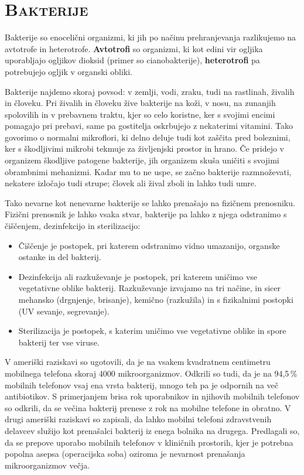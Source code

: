 \documentclass[12pt, a4paper]{report}
\begin{document}
\section{\textsc{Bakterije}}

Bakterije so enocelični organizmi, ki jih po načinu prehranjevanja razlikujemo na avtotrofe in heterotrofe. \textbf{Avtotrofi} so organizmi, ki kot edini vir ogljika uporabljajo ogljikov dioksid (primer so cianobakterije), \textbf{heterotrofi} pa potrebujejo ogljik v organski obliki.

Bakterije najdemo skoraj povsod: v zemlji, vodi, zraku, tudi na rastlinah, živalih in človeku. Pri živalih in človeku žive bakterije na koži, v nosu, na zunanjih spolovilih in v prebavnem traktu, kjer so celo koristne, ker s svojimi encimi pomagajo pri prebavi, same pa gostitelja oskrbujejo z nekaterimi vitamini. Tako govorimo o normalni mikroflori, ki delno deluje tudi kot zaščita pred boleznimi, ker s škodljivimi mikrobi tekmuje za življenjski prostor in hrano. Če pridejo v organizem škodljive patogene bakterije, jih organizem skuša uničiti s svojimi obrambnimi mehanizmi. Kadar mu to ne uspe, se začno bakterije razmnoževati, nekatere izločajo tudi strupe; človek ali žival zboli in lahko tudi umre.

Tako nevarne kot nenevarne bakterije se lahko prenašajo na fizičnem prenosniku. Fizični prenosnik je lahko vsaka stvar, bakterije pa lahko z njega odstranimo s čiščenjem, dezinfekcijo in sterilizacijo:
\begin{itemize}
\item Čiščenje je postopek, pri katerem odstranimo vidno umazanijo, organske ostanke in del bakterij.
\item Dezinfekcija ali razkuževanje je postopek, pri katerem uničimo vse vegetativne oblike bakterij. Razkuževanje izvajamo na tri načine, in sicer mehansko (drgnjenje, brisanje), kemično (razkužila) in s fizikalnimi postopki (UV sevanje, segrevanje).
\item Sterilizacija je postopek, s katerim uničimo vse vegetativne oblike in spore bakterij ter vse viruse.
\end{itemize}

V ameriški raziskavi so ugotovili, da je na vsakem kvadratnem centimetru mobilnega telefona skoraj 4000 mikroorganizmov. Odkrili so tudi, da je na 94,5\,\% mobilnih telefonov vsaj ena vrsta bakterij, mnogo teh pa je odpornih na več antibiotikov. S primerjanjem brisa rok uporabnikov in njihovih mobilnih telefonov so odkrili, da se večina bakterij prenese z rok na mobilne telefone in obratno. V drugi ameriški raziskavi so zapisali, da lahko mobilni telefoni zdravstvenih delavcev služijo kot prenašalci bakterij iz enega bolnika na drugega. Predlagali so, da se prepove uporabo mobilnih telefonov v kliničnih prostorih, kjer je potrebna popolna asepsa (operacijska soba) oziroma je nevarnost prenašanja mikroorganizmov večja.
\end{document}
